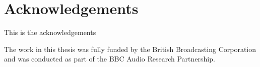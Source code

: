 \chapter*{Acknowledgements}
This is the acknowledgements






The work in this thesis was fully funded by the British Broadcasting Corporation and was conducted as part of the BBC
Audio Research Partnership.
